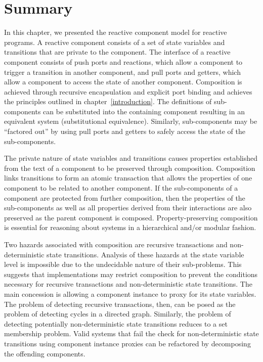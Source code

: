 \section{Summary}
In this chapter, we presented the reactive component model for reactive programs.
A reactive component consists of a set of state variables and transitions that are private to the component.
The interface of a reactive component consists of push ports and reactions, which allow a component to trigger a transition in another component, and pull ports and getters, which allow a component to access the state of another component.
Composition is achieved through recursive encapsulation and explicit port binding and achieves the principles outlined in chapter~\ref{introduction}.
The definitions of sub-components can be substituted into the containing component resulting in an equivalent system (substitutional equivalence).
Similarly, sub-components may be ``factored out'' by using pull ports and getters to safely access the state of the sub-components.

The private nature of state variables and transitions causes properties established from the text of a component to be preserved through composition.
Composition links transitions to form an atomic transaction that allows the properties of one component to be related to another component.
If the sub-components of a component are protected from further composition, then the properties of the sub-components as well as all properties derived from their interactions are also preserved as the parent component is composed.
Property-preserving composition is essential for reasoning about systems in a hierarchical and/or modular fashion.

Two hazards associated with composition are recursive transactions and non-deterministic state transitions.
Analysis of these hazards at the state variable level is impossible due to the undecidable nature of their sub-problems.
This suggests that implementations may restrict composition to prevent the conditions necessary for recursive transactions and non-deterministic state transitions.
The main concession is allowing a component instance to proxy for its state variables.
The problem of detecting recursive transactions, then, can be posed as the problem of detecting cycles in a directed graph.
Similarly, the problem of detecting potentially non-deterministic state transitions reduces to a set membership problem.
Valid systems that fail the check for non-deterministic state transitions using component instance proxies can be refactored by decomposing  the offending components.
